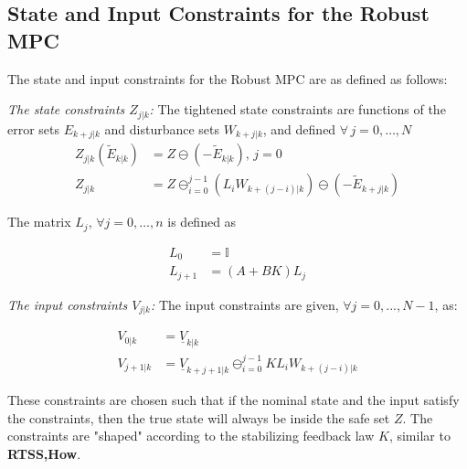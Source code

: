 \subsection{State and Input Constraints for the Robust MPC}
\label{sec:Constraints}
The state and input constraints for the Robust MPC are as defined as follows:

\textit{The state constraints $Z_{j|k}$:}
The tightened state constraints are functions of the error sets $E_{k+j|k}$ and disturbance sets $W_{k+j|k}$, and defined $\forall\,j=0,\dotsc,N$
\small{
\begin{subequations} \label{eq:Set_constraints}
\begin{align}
Z_{j|k}(\tilde{E}_{k|k}) &=Z\ominus(-\tilde{E}_{k|k}), \, j=0\\
Z_{j|k} &= Z \ominus_{i=0}^{j-1}(L_iW_{k+(j-i)|k})\ominus (-\tilde{E}_{k+j|k})
\end{align}
\end{subequations}}


The matrix $L_j$, $\forall j=0,\dotsc,n$   is defined as

\begin{subequations} \label{eq:L_def}
\begin{align}
L_0&=\mathbb{I} \\
L_{j+1} &= (A+BK)L_j
\end{align}
\end{subequations}

\textit{The input constraints $V_{j|k}$:}
The input constraints are given, $\forall j=0,...,N-1$, as:

\begin{subequations}
\begin{align}
\label{eq:input_constraints}
V_{0|k} &= \underline{V}_{k|k} \\
V_{j+1|k} &= \underline{V}_{k+j+1|k} \ominus_{i=0}^{j-1}KL_iW_{k+(j-i)|k} 
\end{align}
\end{subequations}

These constraints are chosen such that if the nominal state and the input satisfy the constraints, then the true state will always be inside the safe set $Z$. The constraints are "shaped" according to the stabilizing feedback law $K$, similar to \textbf{RTSS,How}.

